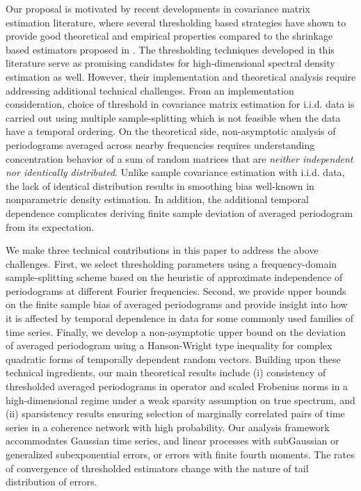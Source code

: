 Our proposal is motivated by recent  developments in covariance matrix estimation literature, where several thresholding based strategies \citep{bickel2008covariance, rothman2009generalized, cai2011adaptive, cai2016rates} have shown to provide good theoretical and empirical properties compared to the shrinkage based estimators proposed in \citet{ledoit2004well}. The thresholding techniques developed in this literature serve as promising candidates for high-dimensional spectral density estimation as well. However, their implementation and theoretical analysis require addressing additional technical challenges. From an implementation consideration, choice of threshold in covariance matrix estimation for i.i.d. data is carried out using multiple sample-splitting \citep{bickel2008covariance} which is not feasible when the data have a temporal ordering. On the theoretical side, non-asymptotic analysis of  periodograms averaged across nearby frequencies requires understanding concentration behavior of a sum of random matrices that are \textit{neither independent nor identically distributed}. Unlike sample covariance estimation with i.i.d. data, the lack of identical distribution results in smoothing bias well-known in nonparametric density estimation. In addition, the additional temporal dependence complicates deriving finite sample deviation of averaged periodogram from its expectation. %

We make three technical contributions in this paper to address the above challenges. First, we select thresholding parameters using a frequency-domain sample-splitting scheme based on the heuristic of approximate independence of periodograms at different Fourier frequencies. Second, we provide upper bounds on the finite sample bias of averaged periodograms and provide insight into how it is affected by temporal dependence in data for some commonly used families of time series. Finally, we develop a non-asymptotic upper bound on the deviation of averaged periodogram using a Hanson-Wright type inequality for complex quadratic forms of temporally dependent random vectors. Building upon these technical ingredients, our main theoretical results include (i) consistency of thresholded averaged periodograms in operator and scaled Frobenius norms in a high-dimensional regime under a weak sparsity assumption on true spectrum, and (ii)  sparsistency results ensuring selection of marginally correlated pairs of time series in a coherence network with high probability. Our analysis  framework accommodates Gaussian time series, and linear processes with subGaussian or generalized subexponential errors, or errors with finite fourth moments. The rates of convergence of thresholded estimators change with the nature of tail distribution of errors.

